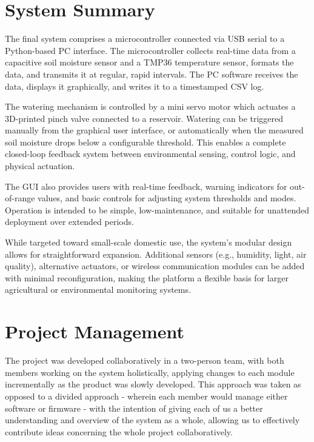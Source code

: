 \documentclass[a4paper,11pt]{article}
\begin{document}
\section{System Summary}
\label{sec:summary}

The final system comprises a microcontroller
connected via USB serial to a Python-based PC interface. 
The microcontroller collects real-time data from a capacitive soil moisture sensor 
and a TMP36 temperature sensor, formats the data, 
and transmits it at regular, rapid intervals. 
The PC software receives the data, displays it graphically, 
and writes it to a timestamped CSV log.

The watering mechanism is controlled by a mini servo motor 
which actuates a 3D-printed pinch valve connected to a reservoir. 
Watering can be triggered manually from the graphical user interface, 
or automatically when the measured soil moisture drops below 
a configurable threshold. 
This enables a complete closed-loop feedback system 
between environmental sensing, control logic, 
and physical actuation.

The GUI also provides users with real-time feedback, 
warning indicators for out-of-range values, 
and basic controls for adjusting system thresholds and modes. 
Operation is intended to be simple, low-maintenance, 
and suitable for unattended deployment over extended periods.

While targeted toward small-scale domestic use, 
the system's modular design allows for straightforward expansion. 
Additional sensors (e.g., humidity, light, air quality), 
alternative actuators, or wireless communication modules 
can be added with minimal reconfiguration, 
making the platform a flexible basis for 
larger agricultural or environmental monitoring systems.

\section{Project Management}
\label{sec:project_management}

The project was developed collaboratively in a two-person team, 
with both members working on the system holistically,
applying changes to each module incrementally
as the product was slowly developed.
This approach was taken as opposed to a divided approach -
wherein each member would manage either software or firmware -
with the intention of giving each of us a better understanding 
and overview of the system as a whole,
allowing us to effectively contribute ideas 
concerning the whole project collaboratively. 
\end{document}
